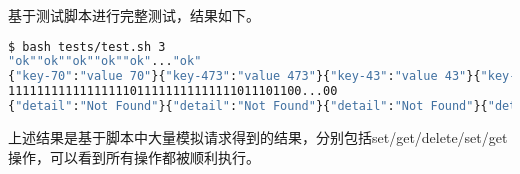 基于测试脚本进行完整测试，结果如下。

\begin{lstlisting}[language=Bash]
$ bash tests/test.sh 3
"ok""ok""ok""ok""ok"..."ok"
{"key-70":"value 70"}{"key-473":"value 473"}{"key-43":"value 43"}{"key-431":"value 431"}{"key-134":"value 134"}{"key-475":"value 475"}{"key-88":"value 88"}...{"key-394":"value 394"}"overwrite""overwrite""overwrite"..."overwrite"
11111111111111111011111111111111011101100...00
{"detail":"Not Found"}{"detail":"Not Found"}{"detail":"Not Found"}{"detail":"Not Found"}{"detail":"Not Found"}{"key-133":"value 133"}{"key-209":"value 209"}{"key-267":"value 267"}{"key-86":"value 86"}{"key-402":"value 402"}...{"detail":"Not Found"}{"detail":"Not Found"}{"detail":"Not Found"}{"detail":"Not Found"}
\end{lstlisting}

上述结果是基于脚本中大量模拟请求得到的结果，分别包括set/get/delete/set/get操作，可以看到所有操作都被顺利执行。